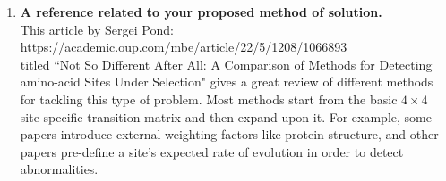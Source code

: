 \documentclass[12pt]{article}
\begin{document}
\begin{enumerate}
    \item \textbf{A reference related to your proposed method of solution.}\\ This article by Sergei Pond:\\ https://academic.oup.com/mbe/article/22/5/1208/1066893 \\
    titled ``Not So Different After All: A Comparison of Methods for Detecting amino-acid Sites Under Selection" gives a great review of different methods for tackling this type of problem. Most methods start from the basic $4 \times 4$ site-specific transition matrix and then expand upon it. For example, some papers introduce external weighting factors like protein structure, and other papers pre-define a site's expected rate of evolution in order to detect abnormalities.
\end{enumerate}
\end{document}
